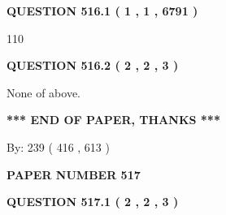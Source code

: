 \documentclass[12pt]{article}
\begin{document}
   
  
\vspace{0.2in}
  
{\textbf{\Large{QUESTION
516.1 
 ( 1 , 1 , 6791 )
}}}
  
  
 
 
\noindent{}

110
 
 
  
\vspace{0.2in}
  
{\textbf{\Large{QUESTION
516.2 
 ( 2 , 2 , 3 )
}}}
  
  
 
 
\noindent{}
 
 
 None of above.
 
 
 
 
   
   
 \vspace{0.2in}
 
   
   
   
   
\vspace{1.0in} 
{\textbf{\large{ *** END OF PAPER, THANKS *** }}} 
   
   
\hspace{1.0in} By: 
 239 ( 416 ,  613 )
   
   
   
   
\newpage 
\setcounter{page}{ 
   517001 } 
   
   
   
   
 {\textbf{ \Large{ PAPER NUMBER  517  }}}
   
   
\vspace{0.2in}
   
   
   
   
   
   
 \vspace{0.2in}
 
 
 
 
   
   
  
\vspace{0.2in}
  
{\textbf{\Large{QUESTION
517.1 
 ( 2 , 2 , 3 )
}}}
  
  
 
\end{document}
